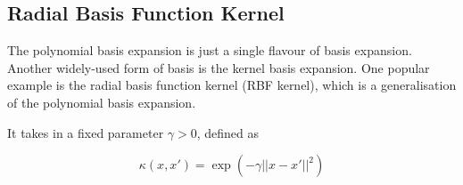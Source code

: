 

\subsection{Radial Basis Function Kernel}

The polynomial basis expansion is just a single flavour of basis expansion. Another widely-used form of basis is the kernel basis expansion. One popular example is the radial basis function kernel (RBF kernel), which is a generalisation of the polynomial basis expansion. \bigskip

It takes in a fixed parameter $\gamma > 0$, defined as

\begin{equation*}
    \kappa(x, x') = \exp(-\gamma ||x - x'||^2)
\end{equation*}

